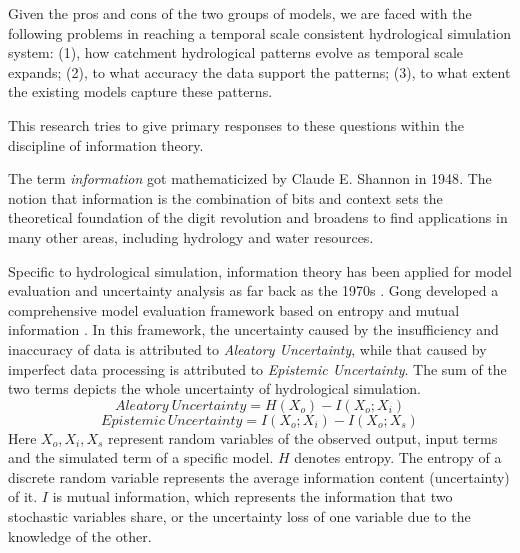 \documentclass[draft,wrr]{AGUTeX}
\begin{document}
\begin{article}
Given the pros and cons of the two groups of models, we are faced with the following problems in reaching a temporal scale consistent hydrological simulation system: (1), how catchment hydrological patterns evolve as temporal scale expands; (2), to what accuracy the data support the patterns; (3), to what extent the existing models capture these patterns.

This research tries to give primary responses to these questions within the discipline of information theory.



The term \emph{information} got mathematicized  by Claude E. Shannon in 1948\citep{shannon2001mathematical}. The notion that information is the combination of bits and context\citep{bryant2003computer} sets the theoretical foundation of the digit revolution and   broadens to find applications in many other areas, including hydrology and water resources\citep{singh1997use,singh2000entropy,singh2013entropy}. 
 
Specific to hydrological simulation,
information theory has been applied for model evaluation and
uncertainty analysis as far back as the 1970s \citep{amorocho1973entropy,chapman1986entropy,abebe2003managing,pokhrel2010use,weijs2010hydrological,weijs2011accounting}
.
Gong developed a comprehensive model evaluation framework based on  entropy  and  mutual information  \citep{gong2013estimating} . In this framework, the uncertainty caused by the insufficiency and inaccuracy of data is attributed to \emph{Aleatory Uncertainty}, while that caused by imperfect data processing is attributed to \emph{Epistemic Uncertainty}. The sum of the two terms depicts the whole uncertainty of hydrological simulation.
\begin{equation}\label{AU}
Aleatory~Uncertainty= H(X_{o})-I(X_{o};X_{i})
\end{equation}
\begin{equation}\label{EU}
Epistemic~Uncertainty=I(X_{o};X_{i})-I(X_{o};X_{s})
\end{equation}
Here $X_o,X_i,X_s$ represent random variables of the observed output, input terms and the simulated term of a specific model. $H$ denotes entropy. The entropy of a discrete random variable represents the average information content (uncertainty) of it. $I$ is  mutual information, which represents the  information that two stochastic variables share, or the uncertainty loss of one variable due to the knowledge of the other.  


\end{article}
\end{document}
